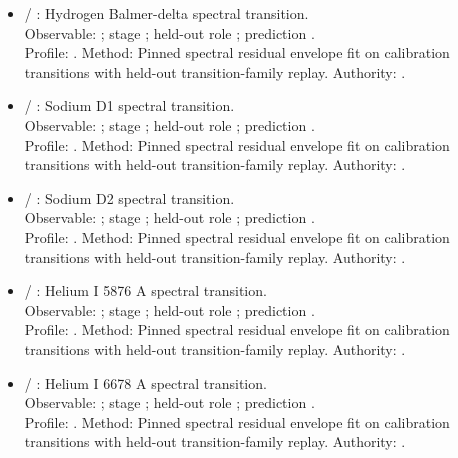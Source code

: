 \begin{itemize}
\item {} / : Hydrogen Balmer-delta spectral transition.\\ Observable: ; stage ; held-out role ; prediction .\\ Profile: . Method: Pinned spectral residual envelope fit on calibration transitions with held-out transition-family replay. Authority: .
\item {} / : Sodium D1 spectral transition.\\ Observable: ; stage ; held-out role ; prediction .\\ Profile: . Method: Pinned spectral residual envelope fit on calibration transitions with held-out transition-family replay. Authority: .
\item {} / : Sodium D2 spectral transition.\\ Observable: ; stage ; held-out role ; prediction .\\ Profile: . Method: Pinned spectral residual envelope fit on calibration transitions with held-out transition-family replay. Authority: .
\item {} / : Helium I 5876 A spectral transition.\\ Observable: ; stage ; held-out role ; prediction .\\ Profile: . Method: Pinned spectral residual envelope fit on calibration transitions with held-out transition-family replay. Authority: .
\item {} / : Helium I 6678 A spectral transition.\\ Observable: ; stage ; held-out role ; prediction .\\ Profile: . Method: Pinned spectral residual envelope fit on calibration transitions with held-out transition-family replay. Authority: .

\end{itemize}
